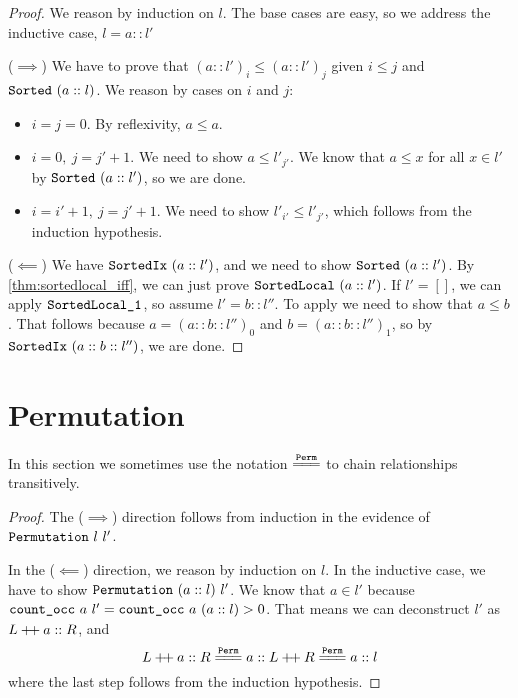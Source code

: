 \documentclass[sigplan,10pt,anonymous,review]{thesis}
\begin{document}
\sortedixiff*
\begin{proof}
  We reason by induction on $l$. The base cases are easy, so we
  address the inductive case, $l = a :: l'$

  ($\implies$) We have to prove that $(a :: l')_i \le (a :: l')_j$ given
  $i \le j$ and $\texttt{\textup{Sorted}}~(a::l)$. We reason by cases on $i$ and $j$:
  \begin{itemize}
  \item $i = j = 0$. By reflexivity, $a \le a$.
  \item $i = 0,~j=j' + 1$. We need to show $a \le l'_{j'}$. We know that
    $a \le x$ for all $x \in l'$ by $\texttt{\textup{Sorted}}~(a::l')$, so we are
    done.
  \item $i = i' +1,~j = j' + 1$. We need to show $l'_{i'} \le l'_{j'}$,
    which follows from the induction hypothesis.
  \end{itemize}

  ($\impliedby$) We have $\texttt{\textup{SortedIx}}\ \allowbreak(a :: l')$, and
  we need to show $\texttt{\textup{Sorted}}\ \allowbreak(a :: l')$. By
  \cref{thm:sortedlocal_iff}, we can just prove
  $\texttt{\textup{SortedLocal}}\ \allowbreak(a :: l')$. If $l' = []$, we can
  apply $\texttt{\textup{SortedLocal\_1}}$, so assume $l' = b :: l''$. To apply
   we need to show that $a \le b$. That follows
  because $a = (a :: b :: l'')_0$ and $b = (a :: b :: l'')_1$, so by
  $\texttt{\textup{SortedIx}}\ \allowbreak(a :: b :: l'')$, we are done.
\end{proof}

\section{Permutation}
\label{appendix:perm}

In this section we sometimes use the notation $\eqperm$ to chain
 relationships transitively.

\permutationcountiff*
\begin{proof}
  The ($\implies$) direction follows from induction in the evidence of
  $\texttt{\textup{Permutation}}~l~l'$.

  In the ($\impliedby$) direction, we reason by induction on $l$. In
  the inductive case, we have to show $\texttt{\textup{Permutation}}~(a::l)~l'$.
  We know that $a \in l'$ because $\texttt{\textup{count\_occ}}~a~l' =
  \texttt{\textup{count\_occ}}~a~(a::l) > 0$. That means we can deconstruct $l'$
  as $L \mathbin{+\mkern-3mu+} a :: R$, and
  \begin{equation*}
    L \dplus a :: R \eqperm a :: L \dplus R \eqperm a :: l
  \end{equation*}
  where the last step follows from the induction hypothesis.
\end{proof}
\end{document}
